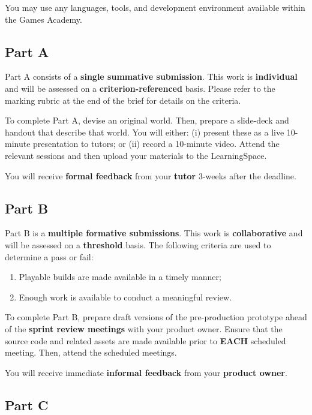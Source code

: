 \documentclass{../../fal_assignment}
\begin{document}
You may use any languages, tools, and development environment available within the Games Academy.

\subsection*{Part A}

Part A consists of a \textbf{single summative submission}. This work is \textbf{individual} and will be assessed on a \textbf{criterion-referenced} basis. Please refer to the marking rubric at the end of the brief for details on the criteria.

To complete Part A, devise an original world. Then, prepare a slide-deck and handout that describe that world. You will either: (i) present these as a live 10-minute presentation to tutors; or (ii) record a 10-minute video. Attend the relevant sessions and then upload your materials to the LearningSpace.

You will receive \textbf{formal feedback} from your \textbf{tutor} 3-weeks after the deadline.

\subsection*{Part B}

Part B is a \textbf{multiple formative submissions}. This work is \textbf{collaborative} and will be assessed on a \textbf{threshold} basis. The following criteria are used to determine a pass or fail:

\begin{enumerate}[label=(\alph*)]
	\item Playable builds are made available in a timely manner;
	\item Enough work is available to conduct a meaningful review.
\end{enumerate}

To complete Part B, prepare draft versions of the pre-production prototype ahead of the \textbf{sprint review meetings} with your product owner. Ensure that the source code and related assets are made available prior to \textbf{EACH} scheduled meeting. Then, attend the scheduled meetings.

You will receive immediate \textbf{informal feedback} from your \textbf{product owner}.

\subsection*{Part C}
\end{document}
